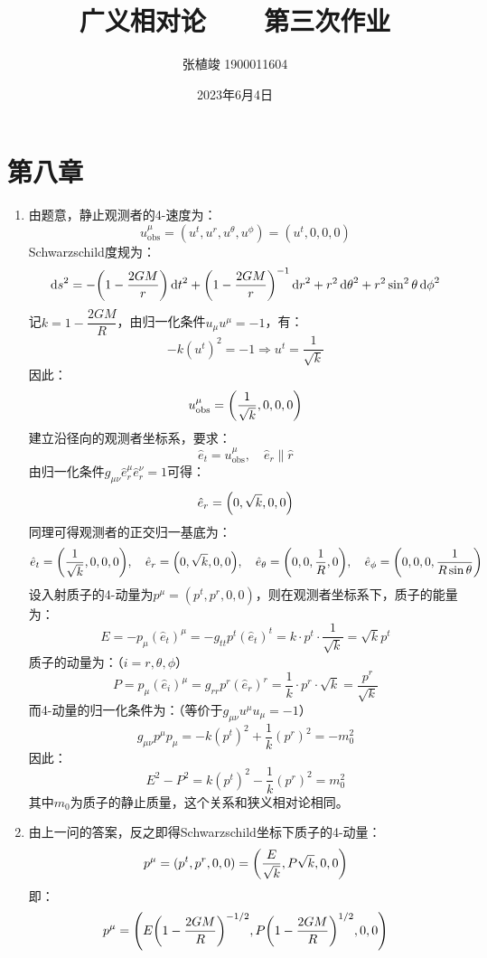\documentclass[a4paper]{article}
\title{\textbf{广义相对论\ \ \ \ 第三次作业}}
\author{张植竣 1900011604}
\date{2023年6月4日}
\begin{document}
\maketitle

\section*{第八章}

\begin{enumerate}
    \item[5.(a)]
    由题意，静止观测者的4-速度为：
    \[
        u^\mu_{\mathrm{obs}} = (u^t, u^r, u^\theta, u^\phi) = (u^t, 0, 0, 0 )
    \]
    Schwarzschild度规为：
    \[
        \dd{s}^2 = -\qty(1 - \frac{2GM}{r}) \dd{t}^2 + \qty(1 - \frac{2GM}{r})^{-1} \dd{r}^2 + r^2 \dd{\theta}^2 + r^2 \sin^2\theta \dd{\phi}^2
    \]
    记$k = 1 - \dfrac{2GM}{R}$，由归一化条件$u_\mu u^\mu = -1$，有：
    \[
        -k (u^t)^2 = -1 \Rightarrow u^t = \dfrac{1}{\sqrt{k}}
    \]
    因此：
    \[
        u^\mu_{\mathrm{obs}} = \qty(\frac{1}{\sqrt{k}}, 0, 0, 0 )
    \]
    建立沿径向的观测者坐标系，要求：
    \[
        \hat{e}_t = u^\mu_{\mathrm{obs}}, \quad
        \hat{e}_r \parallel \hat{r}
    \]
    由归一化条件$g_{\mu\nu} \hat{e}_r^\mu \hat{e}_r^\nu = 1$可得：
    \[
        \hat{e}_r = \qty(0, \sqrt{k}, 0, 0)
    \]
    同理可得观测者的正交归一基底为：
    \[
        \hat{e}_t = \qty(\frac{1}{\sqrt{k}}, 0, 0, 0), \quad
        \hat{e}_r = \qty(0, \sqrt{k}, 0, 0), \quad
        \hat{e}_\theta = \qty(0, 0, \frac{1}{R}, 0), \quad
        \hat{e}_\phi = \qty(0, 0, 0, \frac{1}{R\sin\theta})
    \]
    设入射质子的4-动量为$p^\mu = (p^t, p^r, 0, 0)$，则在观测者坐标系下，质子的能量为：
    \[
        E = -p_\mu (\hat{e}_t)^\mu = -g_{tt} p^t (\hat{e}_t)^t = k \cdot p^t \cdot \frac{1}{\sqrt{k}} = \sqrt{k} p^t
    \]
    质子的动量为：（$i = r, \theta, \phi$）
    \[
        P = p_\mu (\hat{e}_i)^\mu = g_{rr} p^r (\hat{e}_r)^r = \frac{1}{k} \cdot p^r \cdot \sqrt{k} = \frac{p^r}{\sqrt{k}}
    \]
    而4-动量的归一化条件为：（等价于$g_{\mu\nu} u^\mu u_\mu = -1$）
    \[
        g_{\mu\nu} p^\mu p_\mu = -k (p^t)^2 + \frac{1}{k} (p^r)^2 = -m_0^2
    \]
    因此：
    \[
        E^2 - P^2 = k (p^t)^2 - \frac{1}{k} (p^r)^2 = m_0^2
    \]
    其中$m_0$为质子的静止质量，这个关系和狭义相对论相同。

    \item[5.(b)]
    由上一问的答案，反之即得Schwarzschild坐标下质子的4-动量：
    \[
        p^\mu = (p^t, p^r, 0, 0) = \qty(\frac{E}{\sqrt{k}}, P \sqrt{k}, 0, 0)
    \]
    即：
    \[
        p^\mu = \qty(E \qty(1 - \frac{2GM}{R})^{-1/2}, P \qty(1 - \frac{2GM}{R})^{1/2}, 0, 0)
    \]


\end{enumerate}
\end{document}
